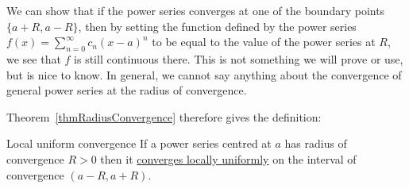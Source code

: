 \documentclass[../Main.tex]{subfiles}
\begin{document}
\begin{remark}
    We can show that if the power series converges at one of the boundary points $\{a+R, a-R\}$, then by setting the function defined by the power series $f(x) = \sum_{n=0}^{\infty}c_n (x-a)^n$ to be equal to the value of the power series at $R$, we see that $f$ is still continuous there. This is not something we will prove or use, but is nice to know. In general, we cannot say anything about the convergence of general power series at the radius of convergence.
\end{remark}
Theorem~\ref{thmRadiusConvergence} therefore gives the definition:
\begin{definition}{Local uniform convergence}
    If a power series centred at $a$ has radius of convergence $R > 0$ then it \underline{converges locally uniformly} on the interval of convergence $(a-R, a+R)$.
\end{definition}
\end{document}
